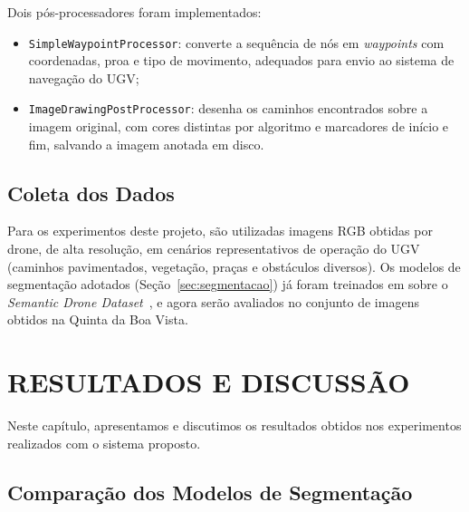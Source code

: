 \documentclass[
    12pt,
    openright,
    oneside,
    a4paper,
    english,
    brazil
]{abntex2}
\begin{document}
Dois pós-processadores foram implementados:
\begin{itemize}
    \item \texttt{SimpleWaypointProcessor}: converte a sequência de nós em \textit{waypoints} com coordenadas, proa e tipo de movimento, adequados para envio ao sistema de navegação do UGV;
    \item \texttt{ImageDrawingPostProcessor}: desenha os caminhos encontrados sobre a imagem original, com cores distintas por algoritmo e marcadores de início e fim, salvando a imagem anotada em disco.
\end{itemize}

\section{Coleta dos Dados}

Para os experimentos deste projeto, são utilizadas imagens RGB obtidas por drone, de alta resolução, em cenários representativos de operação do UGV (caminhos pavimentados, vegetação, praças e obstáculos diversos). Os modelos de segmentação adotados (Seção~\ref{sec:segmentacao}) já foram treinados em \cite{junior2024_models} sobre o \emph{Semantic Drone Dataset}~\cite{drone_dataset}, e agora serão avaliados no conjunto de imagens obtidos na Quinta da Boa Vista.
\chapter{RESULTADOS E DISCUSSÃO}

Neste capítulo, apresentamos e discutimos os resultados obtidos nos experimentos realizados com o sistema proposto.


\section{Comparação dos Modelos de Segmentação}
\end{document}
